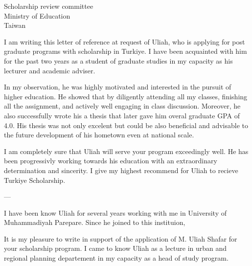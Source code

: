 \documentclass[12pt, a4paper]{simref} %
\begin{document}
\begin{letter}{
	Scholarship review committee\\
	Ministry of Education\\
	Taiwan\\
}
\begin{comment}
I am completely sure that Uliah would make a good impression in his future education.
If the accomplishment of his academic endeavor is a good indication of how he would be seen in days to come, he would be a positive asset to your scholarship. As a lecture who is willing to take a part of student's success, I fully encourage you to consider him for this scholarship.




\closing{Sincerely,}

\newpage
\end{comment}


I am writing this letter of reference at request of  Uliah, who is applying for post graduate programs with scholarship in Turkiye.
I have been acquainted with him for the past two years
as a student of graduate studies in my capacity as his  lecturer and academic adviser.

In my observation, he was highly motivated and interested in the pursuit of higher education. He showed that by diligently attending all my classes, finishing all the assignment, and actively well engaging in class discussion. Moreover, he also successfully wrote his a  thesis that later gave him overal graduate GPA of 4.0. His thesis was not only excelent but could be also beneficial and advisable to the future development of his hometown even at national scale.

I am completely sure that Uliah will serve your program exceedingly well. He has been progressivly working towards his education with an extraordinary determination and sincerity.
I give my highest recommend for Uliah to recieve Turkiye Scholarship.

---

I have been know Uliah for several years working with me in University of Muhammadiyah Parepare. Since he joined to this instituion,

It is my pleasure to write in support of the application of M. Uliah Shafar for your scholarship program. I came to know Uliah as a lecture in urban and regional planning departement in my capacity as a head of study program.




\end{letter}
\end{document}
